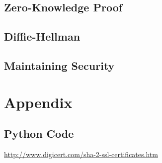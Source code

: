 \documentclass[10pt]{article}
\begin{document}
\subsection{Zero-Knowledge Proof}

\subsection{Diffie-Hellman}

\subsection{Maintaining Security}


\newpage
\section{Appendix}
    \subsection{Python Code}
    
    
    
    
    
    
    
    
    
    

\newpage
\begin{thebibliography}{9}
     \url{http://www.digicert.com/sha-2-ssl-certificates.htm}
\end{thebibliography}
\end{document}
